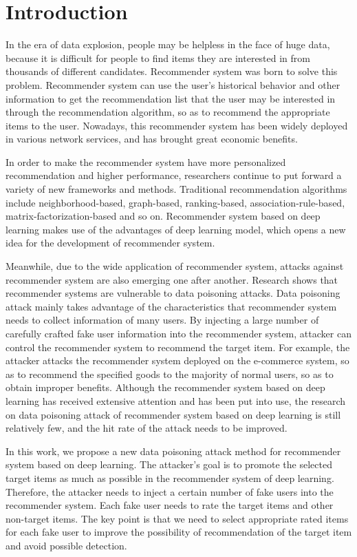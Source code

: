 \section{Introduction}
	In the era of data explosion, people may be helpless in the face of huge data, because it is difficult for people to find items they are interested in from thousands of different candidates. Recommender system was born to solve this problem. Recommender system can use the user's historical behavior and other information to get the recommendation list that the user may be interested in through the recommendation algorithm, so as to recommend the appropriate items to the user. Nowadays, this recommender system has been widely deployed in various network services, and has brought great economic benefits.
	
	In order to make the recommender system have more personalized recommendation and higher performance, researchers continue to put forward a variety of new frameworks and methods. Traditional recommendation algorithms include neighborhood-based, graph-based, ranking-based, association-rule-based, matrix-factorization-based and so on. Recommender system based on deep learning makes use of the advantages of deep learning model, which opens a new idea for the development of recommender system.
	
	Meanwhile, due to the wide application of recommender system, attacks against recommender system are also emerging one after another. Research shows that recommender systems are vulnerable to data poisoning attacks. Data poisoning attack mainly takes advantage of the characteristics that recommender system needs to collect  information of many users. By injecting a large number of carefully crafted fake user information into the recommender system, attacker can control the recommender system to recommend the target item. For example, the attacker attacks the recommender system deployed on the e-commerce system, so as to recommend the specified goods to the majority of normal users, so as to obtain improper benefits. Although the recommender system based on deep learning has received extensive attention and has been put into use, the research on data poisoning attack of recommender system based on deep learning is still relatively few, and the hit rate of the attack needs to be improved.
	
	In this work, we propose a new data poisoning attack method for recommender system based on deep learning. The attacker's goal is to promote the selected target items as much as possible in the recommender system of deep learning. Therefore, the attacker needs to inject a certain number of fake users into the recommender system. Each fake user needs to rate the target items and other non-target items. The key point is that we need to select appropriate rated items for each fake user to improve the possibility of recommendation of the target item and avoid possible detection.
	

